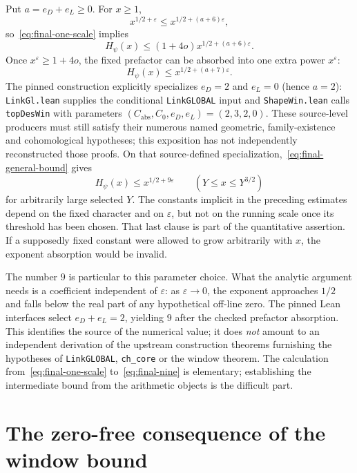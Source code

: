 \documentclass[11pt,openany,oneside]{scrbook}
\theoremstyle{definition}
\theoremstyle{remark}
\newcommand{\eps}{\varepsilon}
\begin{document}
Put $a=e_D+e_L\ge0$.  For $x\ge1$,
\[
x^{1/2+\eps}\le x^{1/2+(a+6)\eps},
\]
so~\eqref{eq:final-one-scale} implies
\[
H_\psi(x)\le(1+4o)x^{1/2+(a+6)\eps}.
\]
Once $x^\eps\ge1+4o$, the fixed prefactor can be absorbed into one extra power $x^\eps$:
\begin{equation}\label{eq:final-general-bound}
H_\psi(x)\le x^{1/2+(a+7)\eps}.
\end{equation}
The pinned construction explicitly specializes $e_D=2$ and $e_L=0$ (hence $a=2$): \texttt{LinkGl.lean} supplies the conditional \texttt{LinkGLOBAL} input and \texttt{ShapeWin.lean} calls \texttt{topDesWin} with parameters $(C_{\mathrm{abs}},C_0,e_D,e_L)=(2,3,2,0)$. These source-level producers must still satisfy their numerous named geometric, family-existence and cohomological hypotheses; this exposition has not independently reconstructed those proofs. On that source-defined specialization,~\eqref{eq:final-general-bound} gives
\begin{equation}\label{eq:final-nine}
\boxed{\displaystyle H_\psi(x)\le x^{1/2+9\eps}
\qquad (Y\le x\le Y^{3/2})}
\end{equation}
for arbitrarily large selected $Y$.  The constants implicit in the preceding estimates depend on the fixed character and on $\eps$, but not on the running scale once its threshold has been chosen.  That last clause is part of the quantitative assertion.  If a supposedly fixed constant were allowed to grow arbitrarily with $x$, the exponent absorption would be invalid.

The number $9$ is particular to this parameter choice. What the analytic argument needs is a coefficient independent of $\eps$: as $\eps\to0$, the exponent approaches $1/2$ and falls below the real part of any hypothetical off-line zero. The pinned Lean interfaces select $e_D+e_L=2$, yielding $9$ after the checked prefactor absorption. This identifies the source of the numerical value; it does \emph{not} amount to an independent derivation of the upstream construction theorems furnishing the hypotheses of \texttt{LinkGLOBAL}, \texttt{ch\_core} or the window theorem. The calculation from~\eqref{eq:final-one-scale} to~\eqref{eq:final-nine} is elementary; establishing the intermediate bound from the arithmetic objects is the difficult part.

\section{The zero-free consequence of the window bound}\label{sec:nine-to-zero-free}
\end{document}
